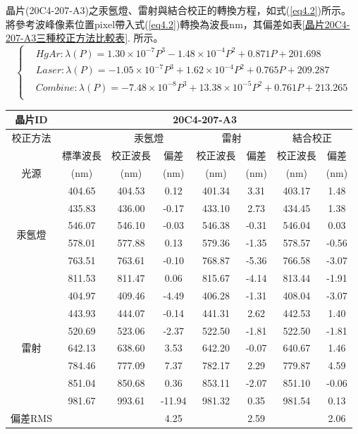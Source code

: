 \newpage%
晶片(20C4-207-A3)之汞氬燈、雷射與結合校正的轉換方程，如式(\ref{eq4.2})所示。將參考波峰像素位置pixel帶入式(\ref{eq4.2})轉換為波長nm，其偏差如表\ref{晶片20C4-207-A3三種校正方法比較表}. 所示。
\begin{equation}\label{eq4.2}
	\begin{cases}		
		& Hg Ar: \lambda(P) = 1.30\times 10^{-7}P^3 -1.48\times 10^{-4}P^2+0.871P+201.698\\
		& Laser: \lambda(P) = -1.05\times 10^{-7}P^3 + 1.62\times 10^{-4}P^2+0.765P+209.287\\
		& Combine: \lambda(P) = -7.48\times 10^{-8}P^3 + 13.38\times 10^{-5}P^2+0.761P+213.265\\
	\end{cases}
\end{equation}
\begin{center}
	\vspace{0.5cm}
	\label{晶片20C4-207-A3三種校正方法比較表}
\begin{tabularx}{\textwidth}{cccccccc}
	\hline\hline
	晶片ID&\multicolumn{7}{c}{20C4-207-A3}\\%
	\hline
	校正方法&&\multicolumn{2}{c}{汞氬燈}&\multicolumn{2}{c}{雷射}&\multicolumn{2}{c}{結合校正}\\
	\hline
	    &標準波長&校正波長&偏差&校正波長&偏差&校正波長&偏差\\
	光源&(nm)   &(nm)    &(nm)&(nm)   &(nm)&(nm)   &(nm)\\
	\hline
	\multirow{6}{*}{汞氬燈}
&404.65&404.53	&0.12	&401.34	&3.31	&403.17	&1.48\\
&435.83&436.00	&-0.17	&433.10	&2.73	&434.45	&1.38\\
&546.07&546.10	&-0.03	&546.38	&-0.31	&546.04	&0.03\\
&578.01&577.88	&0.13	&579.36	&-1.35	&578.57	&-0.56\\
&763.51&763.61	&-0.10	&768.87	&-5.36	&766.58	&-3.07\\
&811.53&811.47	&0.06	&815.67	&-4.14	&813.44	&-1.91\\
\hline
\multirow{7}{*}{雷射}
&404.97&409.46	&-4.49	&406.28	&-1.31	&408.04	&-3.07\\
&443.93&444.07	&-0.14	&441.31	&2.62	&442.53	&1.40\\
&520.69&523.06	&-2.37	&522.50	&-1.81	&522.50	&-1.81\\
&642.13&638.60	&3.53	&642.20	&-0.07	&640.67	&1.46\\
&784.46&777.09	&7.37	&782.17	&2.29	&779.87	&4.59\\
&851.04&850.68	&0.36	&853.11	&-2.07	&851.10	&-0.06\\
&981.67&993.61	&-11.94	&981.32	&0.35	&981.54	&0.13\\
	\hline
	偏差RMS& & &4.25& &2.59& &2.06\\
	\hline\hline
\end{tabularx}
\end{center}
